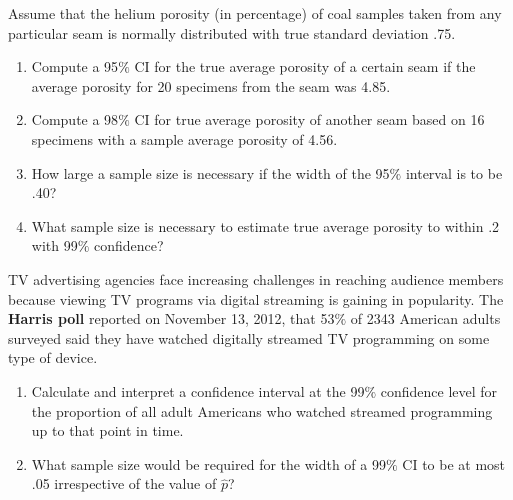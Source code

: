 \documentclass[11pt,letterpaper,boxed]{hmcpset}
\begin{document}
{\begin{solution}
	\vfill
	\end{solution}
\newpage


\begin{problem}[7.1.5]
	Assume that the helium porosity (in percentage) of coal samples taken from any particular seam is normally distributed with true standard deviation .75.
	\begin{enumerate}
		\item
			Compute a 95$\%$ CI for the true average porosity of a certain seam if the average porosity for 20 specimens from the seam was 4.85.
		\item
			Compute a 98$\%$ CI for true average porosity of another seam based on 16 specimens with a sample average porosity of 4.56.
		\item
			How large a sample size is necessary if the width of the 95$\%$ interval is to be .40?
		\item
			What sample size is necessary to estimate true average porosity to within .2 with 99$\%$ confidence?
	\end{enumerate}
\end{problem}

\begin{solution}
	\vfill
\end{solution}
\newpage


\begin{problem}[7.2.20]
	TV advertising agencies face increasing challenges in reaching audience members because viewing TV programs via digital streaming is gaining in popularity. The \textbf{Harris poll} reported on November 13, 2012, that 53$\%$ of 2343 American adults surveyed said they have watched digitally streamed TV programming on some type of device.
	\begin{enumerate}
		\item
			Calculate and interpret a confidence interval at the 99$\%$ confidence level for the proportion of all adult Americans who watched streamed programming up to that point in time.
		\item
			What sample size would be required for the width of a 99$\%$ CI to be at most .05 irrespective of the value of $\hat{p}$?
	\end{enumerate}
\end{problem}

}
\end{document}
